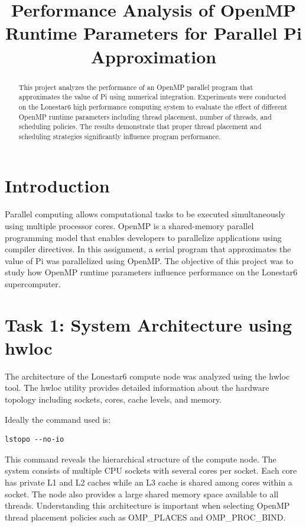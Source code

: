 \documentclass[conference]{IEEEtran}
\title{Performance Analysis of OpenMP Runtime Parameters for Parallel Pi Approximation}
\author{
\IEEEauthorblockN{Anwith Goud Ganamaina}
\IEEEauthorblockA{Department of Computer Science\\
Texas State University\\
San Marcos, TX, USA}
}
\begin{document}
\maketitle

\begin{abstract}
This project analyzes the performance of an OpenMP parallel program that approximates the value of Pi using numerical integration. Experiments were conducted on the Lonestar6 high performance computing system to evaluate the effect of different OpenMP runtime parameters including thread placement, number of threads, and scheduling policies. The results demonstrate that proper thread placement and scheduling strategies significantly influence program performance.
\end{abstract}

\section{Introduction}

Parallel computing allows computational tasks to be executed simultaneously using multiple processor cores. OpenMP is a shared-memory parallel programming model that enables developers to parallelize applications using compiler directives. In this assignment, a serial program that approximates the value of Pi was parallelized using OpenMP. The objective of this project was to study how OpenMP runtime parameters influence performance on the Lonestar6 supercomputer.

\section{Task 1: System Architecture using hwloc}

The architecture of the Lonestar6 compute node was analyzed using the hwloc tool. The hwloc utility provides detailed information about the hardware topology including sockets, cores, cache levels, and memory.

Ideally the command used is:

\begin{verbatim}
lstopo --no-io
\end{verbatim}

This command reveals the hierarchical structure of the compute node. The system consists of multiple CPU sockets with several cores per socket. Each core has private L1 and L2 caches while an L3 cache is shared among cores within a socket. The node also provides a large shared memory space available to all threads. Understanding this architecture is important when selecting OpenMP thread placement policies such as OMP\_PLACES and OMP\_PROC\_BIND.
\end{document}
